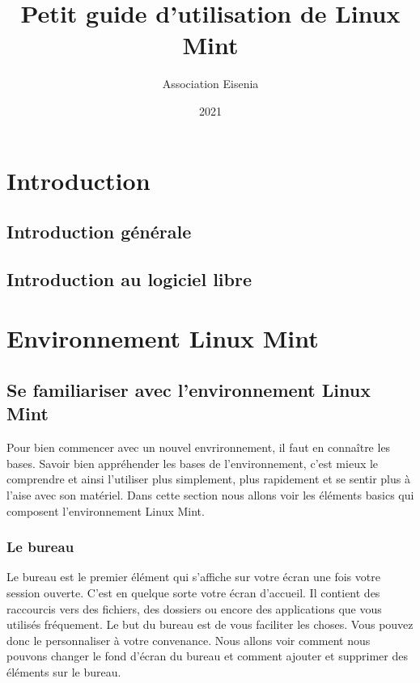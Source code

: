 \documentclass[12pt]{book}
\title{Petit guide d'utilisation de Linux Mint}
\author{Association Eisenia}
\date{2021}
\begin{document}
\maketitle

\newpage
\renewcommand{\contentsname}{Table des matières}
\tableofcontents

\renewcommand{\chaptername}{Chapitre}
\chapter{Introduction}
	\section{Introduction générale}
	\section{Introduction au logiciel libre}

\chapter{Environnement Linux Mint}
\section{Se familiariser avec l'environnement Linux Mint}
	Pour bien commencer avec un nouvel envrironnement, il faut en connaître les bases.
	Savoir bien appréhender les bases de l'environnement, c'est mieux le comprendre et ainsi l'utiliser plus simplement, plus rapidement et se sentir plus à l'aise avec son matériel.\newline
	Dans cette section nous allons voir les éléments basics qui composent l'environnement Linux Mint.
	\subsection{Le bureau}
	Le bureau est le premier élément qui s'affiche sur votre écran une fois votre session ouverte.
	C'est en quelque sorte votre écran d'accueil.
	Il contient des raccourcis vers des fichiers, des dossiers ou encore des applications que vous utilisés fréquement.\newline
	Le but du bureau est de vous faciliter les choses.
	Vous pouvez donc le personnaliser à votre convenance.
	Nous allons voir comment nous pouvons changer le fond d'écran du bureau et comment ajouter et supprimer des éléments sur le bureau.
\end{document}
